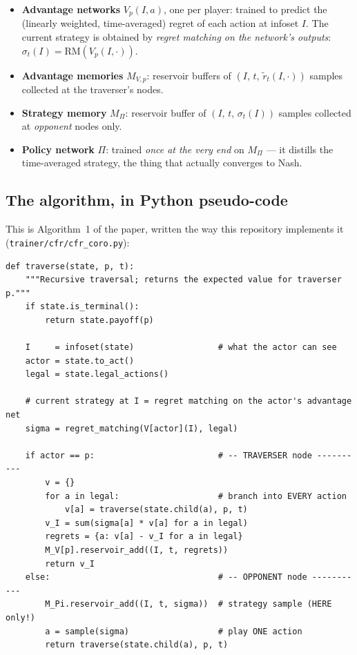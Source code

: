 \documentclass[11pt,a4paper]{article}
\begin{document}
\begin{itemize}[leftmargin=1.4em, itemsep=2pt]
\item \textbf{Advantage networks} $V_p(I,a)$, one per player: trained to predict
  the (linearly weighted, time-averaged) regret of each action at infoset $I$.
  The current strategy is obtained by \emph{regret matching on the network's
  outputs}: $\sigma_t(I)=\mathrm{RM}(V_p(I,\cdot))$.
\item \textbf{Advantage memories} $M_{V,p}$: reservoir buffers of
  $(I,\,t,\,\tilde r_t(I,\cdot))$ samples collected at the traverser's nodes.
\item \textbf{Strategy memory} $M_\Pi$: reservoir buffer of $(I,\,t,\,\sigma_t(I))$
  samples collected at \emph{opponent} nodes only.
\item \textbf{Policy network} $\Pi$: trained \emph{once at the very end} on
  $M_\Pi$ --- it distills the time-averaged strategy, the thing that actually
  converges to Nash.
\end{itemize}

\subsection{The algorithm, in Python pseudo-code}

This is Algorithm~1 of the paper, written the way this repository implements it
(\texttt{trainer/cfr/cfr\_coro.py}):

\begin{lstlisting}[style=py, caption={One external-sampling traversal (the heart of Deep CFR).}]
def traverse(state, p, t):
    """Recursive traversal; returns the expected value for traverser p."""
    if state.is_terminal():
        return state.payoff(p)

    I     = infoset(state)                 # what the actor can see
    actor = state.to_act()
    legal = state.legal_actions()

    # current strategy at I = regret matching on the actor's advantage net
    sigma = regret_matching(V[actor](I), legal)

    if actor == p:                         # -- TRAVERSER node ----------
        v = {}
        for a in legal:                    # branch into EVERY action
            v[a] = traverse(state.child(a), p, t)
        v_I = sum(sigma[a] * v[a] for a in legal)
        regrets = {a: v[a] - v_I for a in legal}
        M_V[p].reservoir_add((I, t, regrets))
        return v_I
    else:                                  # -- OPPONENT node -----------
        M_Pi.reservoir_add((I, t, sigma))  # strategy sample (HERE only!)
        a = sample(sigma)                  # play ONE action
        return traverse(state.child(a), p, t)
\end{lstlisting}
\end{document}
